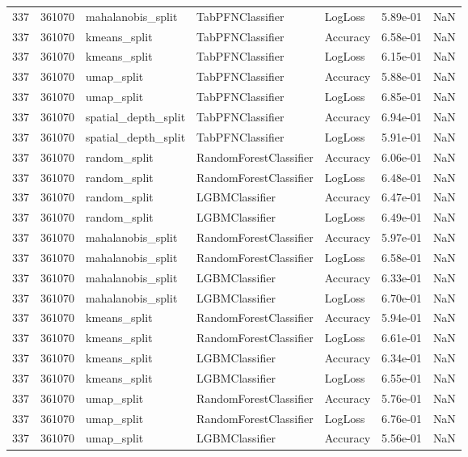 \begin{tabular}{rrlllrr}
337 & 361070 & mahalanobis\_split & TabPFNClassifier & LogLoss & 5.89e-01 & NaN \\
337 & 361070 & kmeans\_split & TabPFNClassifier & Accuracy & 6.58e-01 & NaN \\
337 & 361070 & kmeans\_split & TabPFNClassifier & LogLoss & 6.15e-01 & NaN \\
337 & 361070 & umap\_split & TabPFNClassifier & Accuracy & 5.88e-01 & NaN \\
337 & 361070 & umap\_split & TabPFNClassifier & LogLoss & 6.85e-01 & NaN \\
337 & 361070 & spatial\_depth\_split & TabPFNClassifier & Accuracy & 6.94e-01 & NaN \\
337 & 361070 & spatial\_depth\_split & TabPFNClassifier & LogLoss & 5.91e-01 & NaN \\
337 & 361070 & random\_split & RandomForestClassifier & Accuracy & 6.06e-01 & NaN \\
337 & 361070 & random\_split & RandomForestClassifier & LogLoss & 6.48e-01 & NaN \\
337 & 361070 & random\_split & LGBMClassifier & Accuracy & 6.47e-01 & NaN \\
337 & 361070 & random\_split & LGBMClassifier & LogLoss & 6.49e-01 & NaN \\
337 & 361070 & mahalanobis\_split & RandomForestClassifier & Accuracy & 5.97e-01 & NaN \\
337 & 361070 & mahalanobis\_split & RandomForestClassifier & LogLoss & 6.58e-01 & NaN \\
337 & 361070 & mahalanobis\_split & LGBMClassifier & Accuracy & 6.33e-01 & NaN \\
337 & 361070 & mahalanobis\_split & LGBMClassifier & LogLoss & 6.70e-01 & NaN \\
337 & 361070 & kmeans\_split & RandomForestClassifier & Accuracy & 5.94e-01 & NaN \\
337 & 361070 & kmeans\_split & RandomForestClassifier & LogLoss & 6.61e-01 & NaN \\
337 & 361070 & kmeans\_split & LGBMClassifier & Accuracy & 6.34e-01 & NaN \\
337 & 361070 & kmeans\_split & LGBMClassifier & LogLoss & 6.55e-01 & NaN \\
337 & 361070 & umap\_split & RandomForestClassifier & Accuracy & 5.76e-01 & NaN \\
337 & 361070 & umap\_split & RandomForestClassifier & LogLoss & 6.76e-01 & NaN \\
337 & 361070 & umap\_split & LGBMClassifier & Accuracy & 5.56e-01 & NaN \\

\end{tabular}
